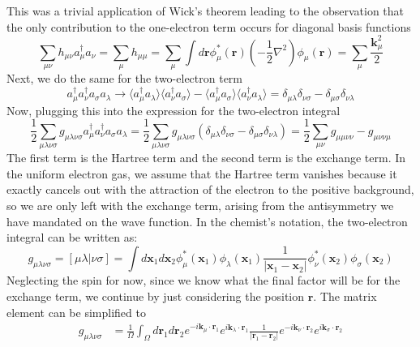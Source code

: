 \documentclass[12pt]{article}
\begin{document}
This was a trivial application of Wick's theorem leading to the observation that the only contribution to the one-electron term occurs for diagonal basis functions
\begin{equation}
    \sum_{\mu\nu} h_{\mu\nu} a^\dagger_\mu a_\nu = \sum_\mu h_{\mu\mu}= \sum_{\mu} \int d\mathbf{r} \phi^*_\mu(\mathbf{r}) \left( -\frac{1}{2} \nabla^2 \right) \phi_\mu(\mathbf{r}) = \sum_{\mu} \frac{\mathbf{k}_\mu^2}{2}
\end{equation}
Next, we do the same for the two-electron term
\begin{equation}
    a^\dagger_\mu a^\dagger_\nu a_\sigma a_\lambda \rightarrow \langle a^\dagger_\mu a_\lambda \rangle \langle a^\dagger_\nu a_\sigma \rangle - \langle a^\dagger_\mu a_\sigma \rangle \langle a^\dagger_\nu a_\lambda \rangle = \delta_{\mu\lambda} \delta_{\nu\sigma} - \delta_{\mu\sigma} \delta_{\nu\lambda}
\end{equation}
Now, plugging this into the expression for the two-electron integral
\begin{equation}
    \frac{1}{2} \sum_{\mu\lambda\nu\sigma} g_{\mu\lambda\nu\sigma} a^\dagger_\mu a^\dagger_\nu a_\sigma a_\lambda = \frac{1}{2} \sum_{\mu\lambda\nu\sigma} g_{\mu\lambda\nu\sigma} \left( \delta_{\mu\lambda} \delta_{\nu\sigma} - \delta_{\mu\sigma} \delta_{\nu\lambda} \right) = \frac{1}{2} \sum_{\mu\nu} g_{\mu\mu\nu\nu} - g_{\mu\nu\nu\mu}
\end{equation}
The first term is the Hartree term and the second term is the exchange term. In the uniform electron gas, we assume that the Hartree term vanishes because it exactly cancels out with the attraction of the electron to the positive background, so we are only left with the exchange term, arising from the antisymmetry we have mandated on the wave function. In the chemist's notation, the two-electron integral can be written as:
\begin{equation}
    g_{\mu\lambda\nu\sigma} = [\mu\lambda|\nu\sigma] = \int d\mathbf{x}_1 d\mathbf{x}_2 \phi^*_\mu(\mathbf{x}_1) \phi_\lambda(\mathbf{x}_1) \frac{1}{|\mathbf{x}_1 - \mathbf{x}_2|} \phi^*_\nu(\mathbf{x}_2) \phi_\sigma(\mathbf{x}_2)
\end{equation}
Neglecting the spin for now, since we know what the final factor will be for the exchange term, we continue by just considering the position $\mathbf{r}$.
The matrix element can be simplified to
\begin{equation}
\begin{aligned}
    g_{\mu\lambda\nu\sigma} &=\frac{1}{\Omega } \int_{\Omega} d\mathbf{r}_1 d\mathbf{r}_2 e^{-i\mathbf{k}_\mu\cdot\mathbf{r}_1} e^{i\mathbf{k}_\lambda\cdot\mathbf{r}_1} \frac{1}{|\mathbf{r}_1 - \mathbf{r}_2|} e^{-i\mathbf{k}_\nu\cdot\mathbf{r}_2} e^{i\mathbf{k}_\sigma\cdot\mathbf{r}_2} \\
\end{aligned}
\end{equation}
\end{document}
